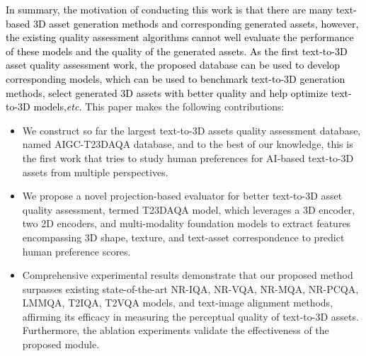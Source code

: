 \textcolor{black}{In summary, the motivation of conducting this work is that there are many text-based 3D asset generation methods and corresponding generated assets, however, the existing quality assessment algorithms cannot well evaluate the performance of these models and the quality of the generated assets. As the first text-to-3D asset quality assessment work, the proposed database can be used to develop corresponding models, which can be used to benchmark text-to-3D generation methods, select generated 3D assets with better quality and help optimize text-to-3D models,\textit{etc.}} This paper makes the following contributions:
\begin{itemize}
    \item We construct so far the largest text-to-3D assets quality assessment database, named AIGC-T23DAQA database, and to the best of our knowledge, this is the first work that tries to study human preferences for AI-based text-to-3D assets from multiple perspectives.
    
    \item We propose a novel projection-based evaluator for better text-to-3D asset quality assessment, termed T23DAQA model, which leverages a 3D encoder, two 2D encoders, and multi-modality foundation models to extract features encompassing 3D shape, texture, and text-asset correspondence to predict human preference scores.
    
    \item Comprehensive experimental results demonstrate that our proposed method surpasses existing state-of-the-art NR-IQA, NR-VQA, NR-MQA, NR-PCQA, LMMQA, T2IQA, T2VQA models, and text-image alignment methods, affirming its efficacy in measuring the perceptual quality of text-to-3D assets. Furthermore, the ablation experiments validate the effectiveness of the proposed module.
    
\end{itemize}

